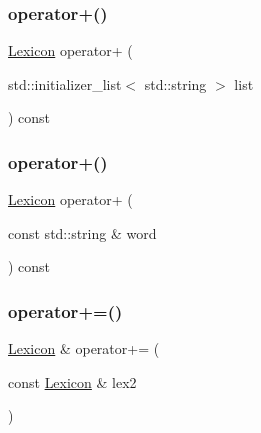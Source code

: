 \subsubsection{\texorpdfstring{operator+()}{operator+()}\hspace{0.1cm}{\footnotesize\ttfamily [2/3]}}
{\footnotesize\ttfamily \mbox{\hyperlink{classLexicon}{Lexicon}} operator+ (\begin{DoxyParamCaption}\item[{std\+::initializer\+\_\+list$<$ std\+::string $>$}]{list }\end{DoxyParamCaption}) const}

\mbox{\label{classLexicon_a44774af5311cf2c8fd054ecf8ff8e76b}} 
\subsubsection{\texorpdfstring{operator+()}{operator+()}\hspace{0.1cm}{\footnotesize\ttfamily [3/3]}}
{\footnotesize\ttfamily \mbox{\hyperlink{classLexicon}{Lexicon}} operator+ (\begin{DoxyParamCaption}\item[{const std\+::string \&}]{word }\end{DoxyParamCaption}) const}

\mbox{\label{classLexicon_afa70421c28007f127e7c4b24666ecc3a}} 
\subsubsection{\texorpdfstring{operator+=()}{operator+=()}\hspace{0.1cm}{\footnotesize\ttfamily [1/3]}}
{\footnotesize\ttfamily \mbox{\hyperlink{classLexicon}{Lexicon}} \& operator+= (\begin{DoxyParamCaption}\item[{const \mbox{\hyperlink{classLexicon}{Lexicon}} \&}]{lex2 }\end{DoxyParamCaption})}

\mbox{\label{classLexicon_a3080ac30a072160945adc5f860ca1785}} 
